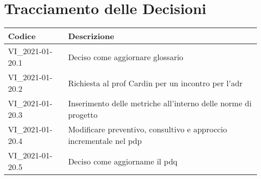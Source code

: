 \section*{Tracciamento delle Decisioni}

\begin{center}
	\begin{longtable}{|p{3.5cm}|p{11cm}|}
		\hline
		\rowcolor{lighter-grayer}
		\textbf{Codice} & \textbf{Descrizione} \\
		\hline
		\endfirsthead

		\hline
		VI\_2021-01-20.1 & Deciso come aggiornare glossario \\
		VI\_2021-01-20.2 & Richiesta al prof Cardin per un incontro per l'adr\\
		VI\_2021-01-20.3 & Inserimento delle metriche all'interno delle norme di progetto\\
		VI\_2021-01-20.4 & Modificare preventivo, consultivo e approccio incrementale nel pdp \\
		VI\_2021-01-20.5 & Deciso come aggiorname il pdq \\
		\hline
	\end{longtable}
\end{center}